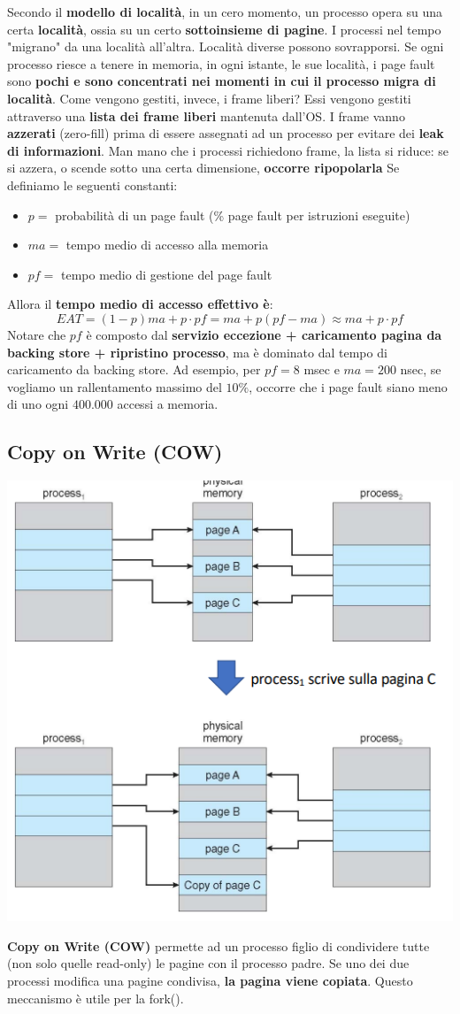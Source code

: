 \documentclass[12pt]{article}
\begin{document}
Secondo il \textbf{modello di località}, in un cero momento, un processo opera su una certa \textbf{località}, ossia su un certo \textbf{sottoinsieme di pagine}.
I processi nel tempo "migrano" da una località all'altra.
Località diverse possono sovrapporsi. Se ogni processo riesce a tenere in memoria, in ogni istante, le sue località, i page fault sono \textbf{pochi e sono concentrati nei momenti in cui il processo migra di località}.
Come vengono gestiti, invece, i frame liberi? Essi vengono gestiti attraverso una \textbf{lista dei frame liberi} mantenuta dall'OS.
I frame vanno \textbf{azzerati} (zero-fill) prima di essere assegnati ad un processo per evitare dei \textbf{leak di informazioni}.
Man mano che i processi richiedono frame, la lista si riduce: se si azzera, o scende sotto una certa dimensione, \textbf{occorre ripopolarla}
Se definiamo le seguenti constanti:
\begin{itemize}
    \item $p =$ probabilità di un page fault (\% page fault per istruzioni eseguite)
    \item $ma = $ tempo medio di accesso alla memoria
    \item $pf = $ tempo medio di gestione del page fault
\end{itemize}
Allora il \textbf{tempo medio di accesso effettivo è}:
$$EAT = (1-p)ma + p \cdot pf = ma + p(pf-ma) \approx ma + p \cdot pf$$
Notare che $pf$ è composto dal \textbf{servizio eccezione + caricamento pagina da backing store + ripristino processo}, ma è dominato dal
tempo di caricamento da backing store.
Ad esempio, per $pf = 8$ msec e $ma = 200$ nsec, se vogliamo un rallentamento massimo del $10\%$, occorre che i page fault siano meno di uno ogni $400.000$ accessi a memoria.
\subsection{Copy on Write (COW)}
\begin{center}
    \includegraphics[width = 0.60\linewidth]{Images/70.png}
\end{center}
\textbf{Copy on Write (COW)} permette ad un processo figlio di condividere tutte (non solo quelle read-only) le pagine con il processo padre.
Se uno dei due processi modifica una pagine condivisa, \textbf{la pagina viene copiata}. Questo meccanismo è utile per la fork().
\end{document}
